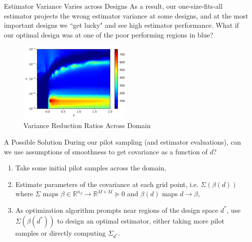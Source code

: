 \documentclass[usenames,dvipsnames]{beamer}
\theoremstyle{definition}
\begin{document}
\begin{frame}{Estimator Variance Varies across Designs}
    As a result, our one-size-fits-all estimator projects the wrong estimator variance at some designs, and at the most important designs we ``get lucky" and see high estimator performance. What if our optimal design was at one of the poor performing regions in blue?
    \begin{figure}
        \centering
        \includegraphics[width=0.5\textwidth]{fig/vrr_opt.png}
        \caption{Variance Reduction Ratios Across Domain}
        \label{fig:corrs_contour}
    \end{figure}
\end{frame}

\begin{frame}{A Possible Solution}
    During our pilot sampling (and estimator evaluations), can we use assumptions of smoothness to get covariance as a function of $d$?
    \begin{enumerate}
        \item Take some initial pilot samples across the domain,
        \item Estimate parameters of the covariance at each grid point, i.e. $\Sigma(\beta(d))$ where $\Sigma$ maps $\beta \in \mathbb{R}^{n_{\beta}} \rightarrow \mathbb{R}^{M\times M} \succeq 0$ and $\beta(d)$ maps $d \rightarrow \beta$,
        \item As optimization algorithm prompts near regions of the design space $d^{*}$, use $\Sigma(\beta(d^{*}))$ to design an optimal estimator, either taking more pilot samples or directly computing $\Sigma_{d^{*}}$.
    \end{enumerate}
\end{frame}
\end{document}
